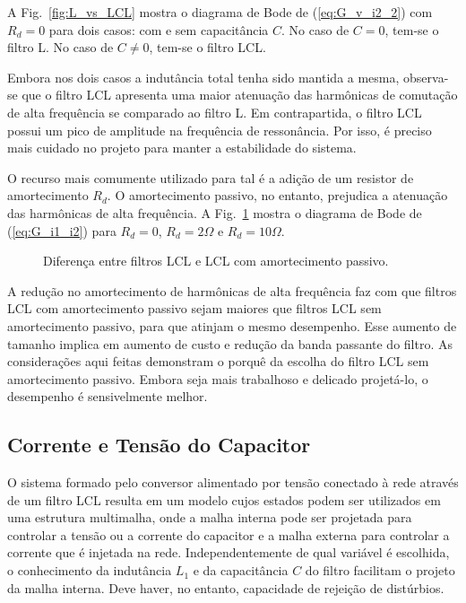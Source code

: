   A Fig.~\ref{fig:L_vs_LCL} mostra o diagrama de Bode de (\ref{eq:G_v_i2_2}) com $R_d = 0$ para dois casos: com e sem capacitância $C$. No caso de $C = 0$, tem-se o filtro L. No caso de $C \neq 0$, tem-se o filtro LCL.

  Embora nos dois casos a indutância total tenha sido mantida a mesma, observa-se que o filtro LCL apresenta uma maior atenuação das harmônicas de comutação de alta frequência se comparado ao filtro L. Em contrapartida, o filtro LCL possui um pico de amplitude na frequência de ressonância. Por isso, é preciso mais cuidado no projeto para manter a estabilidade do sistema.

  O recurso mais comumente utilizado para tal é a adição de um resistor de amortecimento $R_d$. O amortecimento passivo, no entanto, prejudica a atenuação das harmônicas de alta frequência. A Fig.~\ref{fig:R_in_LCL} mostra o diagrama de Bode de (\ref{eq:G_i1_i2}) para $R_d = 0$, $R_d = 2\Omega$ e $R_d = 10\Omega$.

  \begin{figure}[htb]
    \centering{
      \def\svgwidth{\textwidth}
      }
    \caption{Diferença entre filtros LCL e LCL com amortecimento passivo.}
    \label{fig:R_in_LCL}
  \end{figure}

  A redução no amortecimento de harmônicas de alta frequência faz com que filtros LCL com amortecimento passivo sejam maiores que filtros LCL sem amortecimento passivo, para que atinjam o mesmo desempenho. Esse aumento de tamanho implica em aumento de custo e redução da banda passante do filtro. As considerações aqui feitas demonstram o porquê da escolha do filtro LCL sem amortecimento passivo. Embora seja mais trabalhoso e delicado projetá-lo, o desempenho é sensivelmente melhor.


\subsection{Corrente e Tensão do Capacitor}

  O sistema formado pelo conversor alimentado por tensão conectado à rede através de um filtro LCL resulta em um modelo cujos estados podem ser utilizados em uma estrutura multimalha, onde a malha interna pode ser projetada para controlar a tensão ou a corrente do capacitor e a malha externa para controlar a corrente que é injetada na rede. Independentemente de qual variável é escolhida, o conhecimento da indutância $L_1$ e da capacitância $C$ do filtro facilitam o projeto da malha interna. Deve haver, no entanto, capacidade de rejeição de distúrbios.


